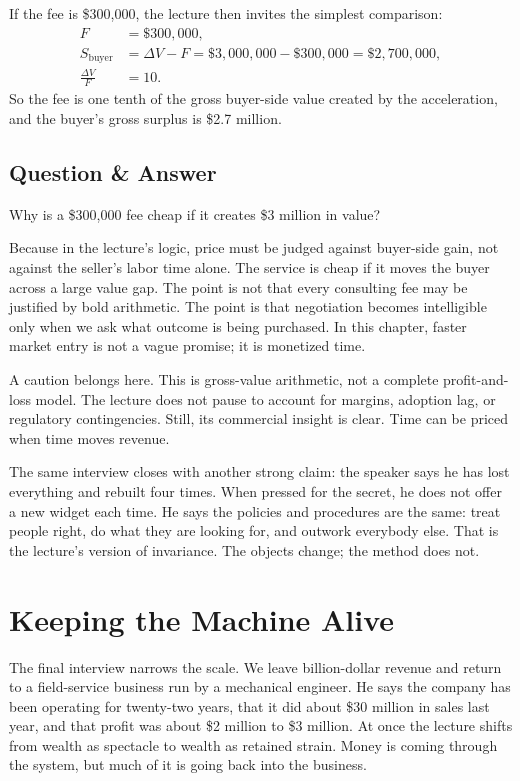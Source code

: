 If the fee is \$300{,}000, the lecture then invites the simplest comparison:
\begin{align}
F &= \$300{,}000,\\
S_{\mathrm{buyer}} &= \Delta V - F = \$3{,}000{,}000 - \$300{,}000 = \$2{,}700{,}000,\\
\frac{\Delta V}{F} &= 10.
\end{align}
So the fee is one tenth of the gross buyer-side value created by the acceleration, and the buyer's gross surplus is \$2.7 million.

\subsection{Question \& Answer}

Why is a \$300{,}000 fee cheap if it creates \$3 million in value?

Because in the lecture's logic, price must be judged against buyer-side gain, not against the seller's labor time alone. The service is cheap if it moves the buyer across a large value gap. The point is not that every consulting fee may be justified by bold arithmetic. The point is that negotiation becomes intelligible only when we ask what outcome is being purchased. In this chapter, faster market entry is not a vague promise; it is monetized time.

A caution belongs here. This is gross-value arithmetic, not a complete profit-and-loss model. The lecture does not pause to account for margins, adoption lag, or regulatory contingencies. Still, its commercial insight is clear. Time can be priced when time moves revenue.

The same interview closes with another strong claim: the speaker says he has lost everything and rebuilt four times. When pressed for the secret, he does not offer a new widget each time. He says the policies and procedures are the same: treat people right, do what they are looking for, and outwork everybody else. That is the lecture's version of invariance. The objects change; the method does not.

\section{Keeping the Machine Alive}

The final interview narrows the scale. We leave billion-dollar revenue and return to a field-service business run by a mechanical engineer. He says the company has been operating for twenty-two years, that it did about \$30 million in sales last year, and that profit was about \$2 million to \$3 million. At once the lecture shifts from wealth as spectacle to wealth as retained strain. Money is coming through the system, but much of it is going back into the business.

